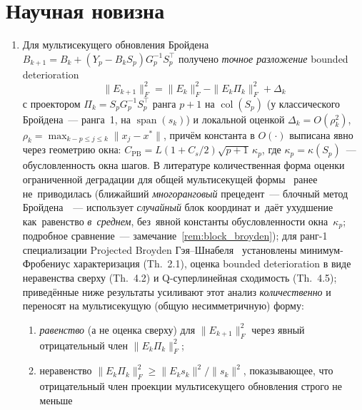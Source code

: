 \section*{Научная новизна}

\begin{enumerate}[leftmargin=*]
  \item Для мультисекущего обновления Бройдена~\cite{schnabel1983}
        $B_{k+1} = B_k + (Y_p - B_k S_p)G_p^{-1}S_p^\top$ получено
        \emph{точное разложение} bounded deterioration
        \[
          \|E_{k+1}\|_F^2 = \|E_k\|_F^2 - \|E_k\Pi_k\|_F^2 + \Delta_k
        \]
        с проектором $\Pi_k = S_p G_p^{-1} S_p^\top$ ранга $p{+}1$ на
        $\operatorname{col}(S_p)$ (у классического Бройдена~--- ранга~1,
        на $\operatorname{span}(s_k)$) и локальной оценкой
        $\Delta_k = O(\rho_k^2)$,
        $\rho_k = \max_{k-p\le j\le k}\|x_j-x^*\|$, причём константа в
        $O(\cdot)$ выписана явно через геометрию окна:
        $C_{\mathrm{PB}} = L(1+C_s/2)\sqrt{p+1}\,\kappa_p$, где
        $\kappa_p = \kappa(S_p)$~--- обусловленность окна шагов.
        В литературе количественная форма оценки ограниченной деградации
        для общей мультисекущей формы~\cite{schnabel1983} ранее
        не~приводилась (ближайший \emph{многоранговый} прецедент~---
        блочный метод Бройдена~\cite{liu2023block}~--- использует
        \emph{случайный} блок координат и~даёт ухудшение как~равенство
        \emph{в~среднем}, без~явной константы обусловленности
        окна~$\kappa_p$; подробное сравнение~--- замечание~\ref{rem:block_broyden}); для ранг-1 специализации Projected Broyden
        Гэя--Шнабеля~\cite{gay_schnabel1978} установлены
        минимум-Фробениус характеризация (Th.~2.1), оценка bounded
        deterioration в виде неравенства сверху (Th.~4.2) и Q-суперлинейная
        сходимость (Th.~4.5); приведённые ниже результаты усиливают этот
        анализ \emph{количественно} и переносят на мультисекущую (общую
        несимметричную) форму:
        \begin{enumerate}[label=(\alph*),leftmargin=*]
          \item \emph{равенство} (а не оценка сверху)
                для $\|E_{k+1}\|_F^2$ через явный отрицательный
                член $\|E_k\Pi_k\|_F^2$;
          \item неравенство
                $\|E_k\Pi_k\|_F^2 \ge \|E_k s_k\|^2/\|s_k\|^2$,
                показывающее, что отрицательный член проекции
                мультисекущего обновления строго не меньше

\end{enumerate}
\end{enumerate}
